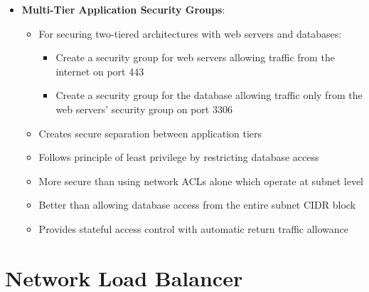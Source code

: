 \documentclass[11pt,a4paper]{report}
\begin{document}
\begin{itemize}
\begin{itemize}
\begin{itemize}
  \item Use Lake Formation tag-based access control permissions
  \item Define tags for specific data resources requiring access
  \item Grant permissions based on these tags to users in other accounts
\end{itemize}
  \item Provides granular access control without copying data between accounts
  \item More efficient than creating a common account with IAM roles
  \item Reduces operational overhead compared to copying data or creating custom solutions
  \item Perfect for organizations with central data teams serving multiple departments with separate AWS accounts
  \item Maintains security while enabling cross-account collaboration
\end{itemize}
  \item \textbf{Multi-Tier Application Security Groups}:
\begin{itemize}
  \item For securing two-tiered architectures with web servers and databases:
\begin{itemize}
  \item Create a security group for web servers allowing traffic from the internet on port 443
  \item Create a security group for the database allowing traffic only from the web servers' security group on port 3306
\end{itemize}
  \item Creates secure separation between application tiers
  \item Follows principle of least privilege by restricting database access
  \item More secure than using network ACLs alone which operate at subnet level
  \item Better than allowing database access from the entire subnet CIDR block
  \item Provides stateful access control with automatic return traffic allowance
\end{itemize}
\end{itemize}


\section{Network Load Balancer}
\end{document}
